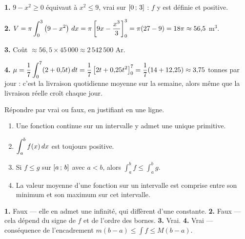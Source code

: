 \begin{corrige}
\textbf{1.} $9-x^{2} \geq 0$ équivaut à $x^{2} \leq 9$, vrai sur
$\left[0\,;\,3\right]$ : $f$ y est définie et positive.

\textbf{2.} $V = \pi\displaystyle\int_{0}^{3}\left(9-x^{2}\right)\,dx
= \pi\left[9x-\frac{x^{3}}{3}\right]_{0}^{3} = \pi(27-9) = 18\pi \approx 56{,}5$
m$^{3}$.

\textbf{3.} Coût $\approx 56{,}5 \times 45\,000 \approx 2\,542\,500$ Ar.

\textbf{4.} $\mu = \dfrac{1}{7}\displaystyle\int_{0}^{7}(2+0{,}5t)\,dt
= \dfrac{1}{7}\left[2t+0{,}25t^{2}\right]_{0}^{7}
= \dfrac{1}{7}(14+12{,}25) \approx 3{,}75$ tonnes par jour : c'est la
livraison quotidienne moyenne sur la semaine, alors même que la livraison
réelle croît chaque jour.
\end{corrige}

\begin{jemeteste}
Répondre par vrai ou faux, en justifiant en une ligne.

\begin{enumerate}[label=\textbf{\arabic*.}, leftmargin=*, itemsep=0.28em]
  \item Une fonction continue sur un intervalle y admet une unique primitive.
  \item $\displaystyle\int_{a}^{b} f(x)\,dx$ est toujours positive.
  \item Si $f \leq g$ sur $\left[a\,;\,b\right]$ avec $a<b$, alors
        $\int_{a}^{b} f \leq \int_{a}^{b} g$.
  \item La valeur moyenne d'une fonction sur un intervalle est comprise entre
        son minimum et son maximum sur cet intervalle.
\end{enumerate}
\end{jemeteste}

\begin{corrige}[je me teste]
\textbf{1.} Faux — elle en admet une infinité, qui diffèrent d'une constante.
\textbf{2.} Faux — cela dépend du signe de $f$ et de l'ordre des bornes.
\textbf{3.} Vrai.
\textbf{4.} Vrai — conséquence de l'encadrement $m(b-a) \leq \int f \leq M(b-a)$.
\end{corrige}

